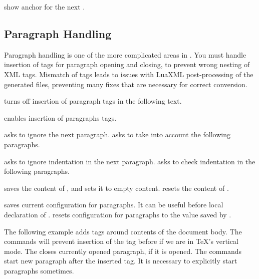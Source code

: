 show anchor for the next .

\subsection{Paragraph Handling}
\label{sec:paragraph_handling}

Paragraph handling is one of the more complicated areas in \texfourht.
You must handle insertion of tags for paragraph opening and closing,
to prevent wrong nesting of XML tags. Mismatch of tags leads to issues with 
LuaXML post-processing of the generated files, preventing many fixes 
that are necessary for correct conversion.

 turns off insertion of paragraph tags in the following text.

 enables insertion of paragraphs tags.

 asks to ignore the next paragraph.
 asks to take into account the following paragraphs.

  asks to ignore indentation in the next paragraph.
    asks to check indentation in the following paragraphs.

  saves the content of , and sets it to empty content.
 resets the content of .

 saves current configuration for paragraphs. It can be
useful before local declaration of .
 resets configuration for paragraphs to the value saved by
.


The following example adds  tags around contents of the document body.
The \texcommand{\ifvmode\IgnorePar\fi} commands will prevent insertion of the  tag 
before  if we are in \TeX's vertical mode. The \texcommand{\EndP} closes currently
opened paragraph, if it is opened. The \texcommand{\par\ShowPar} commands start new paragraph
after the inserted  tag. It is necessary to explicitly start paragraphs sometimes.

\begin{texsource}
{\ifvmode\IgnorePar\fi\EndP
 \par\ShowPar}
{\ifvmode\IgnorePar\fi\EndP
 }
\end{texsource}


